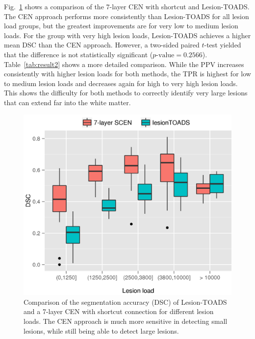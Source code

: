 

Fig.~\ref{fig:l2vlt} shows a comparison of the 7-layer CEN with shortcut and
Lesion-TOADS. The CEN approach performs more consistently than Lesion-TOADS for
all lesion load groups, but the greatest improvements are for very low to medium
lesion loads. For the group with very high lesion loads, Lesion-TOADS achieves a
higher mean DSC than the CEN approach. However, a two-sided paired $t$-test
yielded that the difference is not statistically significant
($p\text{-value}=0.2566$). Table~\ref{tab:result2} shows a more detailed
comparison. While the PPV increases consistently with higher lesion loads for
both methods, the TPR is highest for low to medium lesion loads and decreases
again for high to very high lesion loads. This shows the difficulty for both
methods to correctly identify very large lesions that can extend far into the
white matter.

\begin{figure}[tb] \centering
\includegraphics[width=\columnwidth]{figures/boxplot_L2vsLT}
\caption{Comparison of the segmentation accuracy (DSC) of
Lesion-TOADS and a 7-layer CEN with shortcut connection for different lesion
loads. The CEN approach is much more sensitive in detecting small lesions, while
still being able to detect large lesions.}
\label{fig:l2vlt}
\end{figure}

